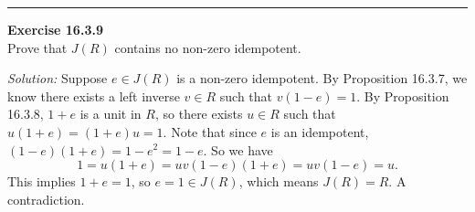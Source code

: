 \documentclass[a4paper, 12pt]{article}
\newenvironment{problem}[2][Exercise]
    { \begin{mdframed}[backgroundcolor=gray!20] \textbf{#1 #2} \\}
    {  \end{mdframed}}
\newenvironment{solution}
    {\textit{Solution:}}
    {}
\begin{document}
\noindent\rule{7in}{2.8pt}
\begin{problem}{16.3.9}
Prove that \(J(R)\) contains no non-zero idempotent.
\end{problem}
\begin{solution}
Suppose \(e\in J(R)\) is a non-zero idempotent. By Proposition 16.3.7, we know there exists a left inverse \(v\in R\) such that \(v(1-e)=1\). By Proposition 16.3.8, \(1+e\) is a unit in \(R\), so there exists \(u\in R\) such that 
\(u(1+e)=(1+e)u=1\). Note that since \(e\) is an idempotent, \((1-e)(1+e)=1-e^2=1-e\). So we have 
\[1=u(1+e)=uv(1-e)(1+e)=uv(1-e)=u.\]
This implies \(1+e=1\), so \(e=1\in J(R)\), which means \(J(R)=R\). A contradiction.
\end{solution}
\end{document}
